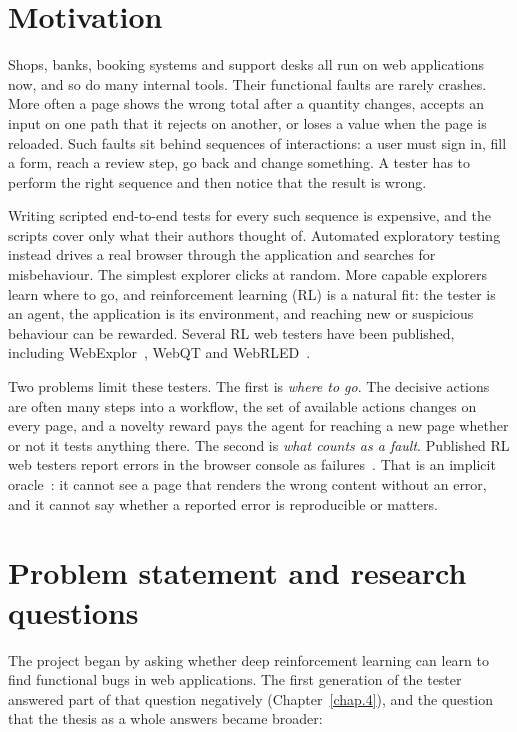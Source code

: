 \label{chap.1}

\section{Motivation}

Shops, banks, booking systems and support desks all run on web applications now, and so do
many internal tools. Their functional faults are rarely crashes. More often a page shows the
wrong total after a quantity changes, accepts an input on one path that it rejects on
another, or loses a value when the page is reloaded. Such faults sit behind sequences of
interactions: a user must sign in, fill a form, reach a review step, go back and change
something. A tester has to perform the right sequence and then notice that the result is
wrong.

Writing scripted end-to-end tests for every such sequence is expensive, and the scripts
cover only what their authors thought of. Automated exploratory testing instead drives a real
browser through the application and searches for misbehaviour. The simplest explorer clicks
at random. More capable explorers learn where to go, and reinforcement learning (RL) is a
natural fit: the tester is an agent, the application is its environment, and reaching new or
suspicious behaviour can be rewarded. Several RL web testers have been published, including
WebExplor~\cite{zheng2021webexplor}, WebQT and
WebRLED~\cite{gu2025webrled}.

Two problems limit these testers. The first is \emph{where to go}. The decisive actions are
often many steps into a workflow, the set of available actions changes on every page, and a
novelty reward pays the agent for reaching a new page whether or not it tests anything
there. The second is
\emph{what counts as a fault}. Published RL web testers report errors in the browser console
as failures~\cite{zheng2021webexplor, gu2025webrled}. That is an implicit
oracle~\cite{barr2015oracle}: it cannot see a page that renders the wrong content without an
error, and it cannot say whether a reported error is reproducible or matters.

\section{Problem statement and research questions}

The project began by asking whether deep reinforcement learning can learn to find
functional bugs in web applications. The first generation of the tester answered part of
that question negatively (Chapter~\ref{chap.4}), and the question that the thesis as a whole
answers became broader:

